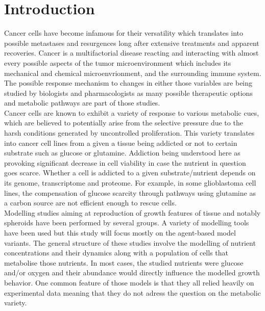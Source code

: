 \documentclass[11pt,a4paper]{article}
\begin{document}
\section{Introduction}
Cancer cells have become infamous for their versatility which translates into possible metastases and resurgences long after extensive treatments and apparent recoveries. Cancer is a multifactorial disease reacting and interacting with almost every possible aspects of the tumor microenvironment which includes its mechanical and chemical microenvrionment, and the surrounding immune system. The possible response mechanism to changes in either those variables are being studied by biologists and pharmacologists as many possible therapeutic options and metabolic pathways are part of those studies.\\

Cancer cells are known to exhibit a variety of response to various metabolic cues, which are believed to potentially arise from the selective pressure due to the harsh conditions generated by uncontrolled proliferation.\cite{Griguer2005}\cite{Azzalin2020}\cite{Yusuf2022}\cite{Stuart2023} This variety translates into cancer cell lines from a given a tissue being addicted or not to certain substrate such as glucose or glutamine. Addiction being understood here as provoking significant decrease in cell viability in case the nutrient in question goes scarce. Whether a cell is addicted to a given substrate/nutrient depends on its genome, transcriptome and proteome. For example, in some glioblastoma cell lines, the compensation of glucose scarcity through pathways using glutamine as a carbon source are not efficient enough to rescue cells.\cite{Yusuf2022}\\

Modelling studies aiming at reproduction of growth features of tissue and notably spheroids have been performed by several groups.\cite{Cleri2019}\cite{Kempf2015}\cite{Rejniak2012} A variety of modelling tools have been used but this study will focus mostly on the agent-based model variants. The general structure of these studies involve the modelling of nutrient concentrations and their dynamics along with a population of cells that metabolise those nutrients. In most cases, the studied nutrients were glucose and/or oxygen and their abundance would directly influence the modelled growth behavior.\cite{Kempf2005}\cite{Mao2018}\cite{Bull2020}\cite{Jagiella2016} One common feature of those models is that they all relied heavily on experimental data meaning that they do not adress the question on the metabolic variety.\\
\end{document}
